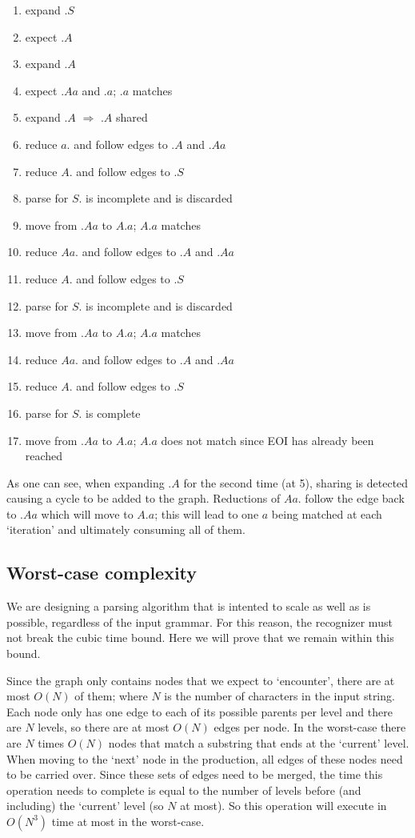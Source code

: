 \documentclass[a4paper,10pt]{article}
\begin{document}
\begin{enumerate}
 \setlength{\itemsep}{0pt}
 \setlength{\parskip}{0pt}
 \setlength{\parsep}{0pt}
 
 \item expand $.S$
 \item expect $.A$
 \item expand $.A$
 \item expect $.Aa$ and $.a$; $.a$ matches
 \item expand $.A$ $\Rightarrow$ $.A$ shared
 \item reduce $a.$ and follow edges to $.A$ and $.Aa$
 \item reduce $A.$ and follow edges to $.S$
 \item parse for $S.$ is incomplete and is discarded
 \item move from $.Aa$ to $A.a$; $A.a$ matches
 \item reduce $Aa.$ and follow edges to $.A$ and $.Aa$
 \item reduce $A.$ and follow edges to $.S$
 \item parse for $S.$ is incomplete and is discarded
 \item move from $.Aa$ to $A.a$; $A.a$ matches
 \item reduce $Aa.$ and follow edges to $.A$ and $.Aa$
 \item reduce $A.$ and follow edges to $.S$
 \item parse for $S.$ is complete
 \item move from $.Aa$ to $A.a$; $A.a$ does not match since EOI has already been reached
\end{enumerate}
As one can see, when expanding $.A$ for the second time (at 5), sharing is detected causing a cycle to be added to the graph. Reductions of $Aa.$ follow the edge back to $.Aa$ which will move to $A.a$; this will lead to one $a$ being matched at each `iteration' and ultimately consuming all of them.

\subsection{Worst-case complexity}
\label{subsec:recognizerComplexity}

We are designing a parsing algorithm that is intented to scale as well as is possible, regardless of the input grammar. For this reason, the recognizer must not break the cubic time bound. Here we will prove that we remain within this bound.

Since the graph only contains nodes that we expect to `encounter', there are at most $O(N)$ of them; where $N$ is the number of characters in the input string. Each node only has one edge to each of its possible parents per level and there are $N$ levels, so there are at most $O(N)$ edges per node. In the worst-case there are $N$ times $O(N)$ nodes that match a substring that ends at the `current' level. When moving to the `next' node in the production, all edges of these nodes need to be carried over. Since these sets of edges need to be merged, the time this operation needs to complete is equal to the number of levels before (and including) the `current' level (so $N$ at most). So this operation will execute in $O(N^3)$ time at most in the worst-case.
\end{document}

